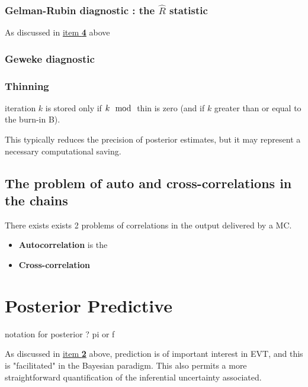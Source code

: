 \documentclass[11pt,a4paper,openany ]{book}
\begin{document}
\subsubsection*{Gelman-Rubin diagnostic : the $\hat{R}$ statistic}

As discussed in \hyperref[convdiag4]{item \textbf{4}} above

\subsubsection*{Geweke diagnostic}



\subsubsection*{Thinning}

iteration $k$ is stored only if $k \mod$ thin is zero (and if $k$ greater than or equal to the burn-in B).

This typically reduces the precision of posterior estimates, but it may represent a necessary computational saving.


\subsection{The problem of auto and cross-correlations in the chains}


There exists exists 2 problems of correlations in the output delivered by a MC. 

\begin{itemize}
	\item \textbf{Autocorrelation} is the
	\item \textbf{Cross-correlation}
\end{itemize}


\section{Posterior Predictive}
notation for posterior ? pi or f


As discussed in \hyperref[it2bayes]{item \textbf{2}} above, prediction is of important interest in EVT, and this is "facilitated" in the Bayesian paradigm. This also permits a more straightforward quantification of the inferential uncertainty associated.
\end{document}
